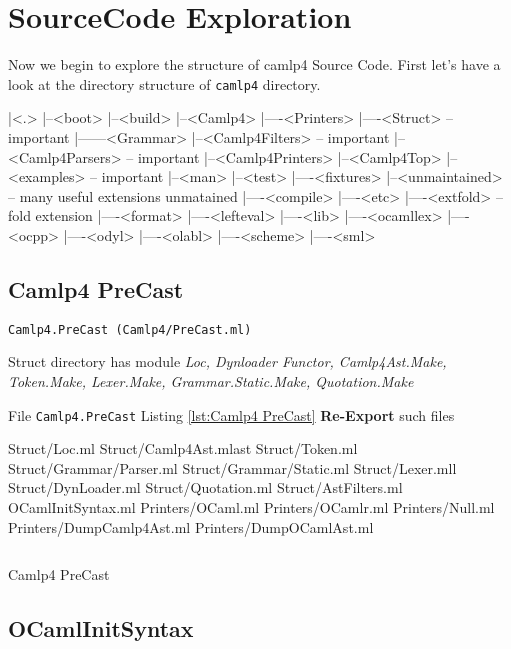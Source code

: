 \section{SourceCode Exploration}
Now we begin to explore the structure of camlp4 Source Code.  First
let's have a look at the directory structure of \verb|camlp4|
directory.


\begin{bluetext}
|<.>
|--<boot>
|--<build>
|--<Camlp4>
|----<Printers>
|----<Struct>       -- important
|------<Grammar> 
|--<Camlp4Filters>  -- important 
|--<Camlp4Parsers>  -- important 
|--<Camlp4Printers> 
|--<Camlp4Top>
|--<examples>       -- important
|--<man>
|--<test>
|----<fixtures>
|--<unmaintained>   -- many useful extensions unmatained
|----<compile>
|----<etc>
|----<extfold>      -- fold extension 
|----<format>
|----<lefteval>
|----<lib>
|----<ocamllex>
|----<ocpp>
|----<odyl>
|----<olabl>
|----<scheme>
|----<sml>
\end{bluetext}


\subsection{Camlp4 PreCast}
\verb|Camlp4.PreCast (Camlp4/PreCast.ml)|

Struct directory has module \textit{Loc, Dynloader Functor,
  Camlp4Ast.Make, Token.Make, Lexer.Make, Grammar.Static.Make,
  Quotation.Make}

File \verb|Camlp4.PreCast| Listing \ref{lst:Camlp4 PreCast}
\textbf{Re-Export} such files

    \begin{bluetext}
    Struct/Loc.ml 
    Struct/Camlp4Ast.mlast 
    Struct/Token.ml 
    Struct/Grammar/Parser.ml 
    Struct/Grammar/Static.ml 
    Struct/Lexer.mll 
    Struct/DynLoader.ml 
    Struct/Quotation.ml 
    Struct/AstFilters.ml 
    OCamlInitSyntax.ml 
    Printers/OCaml.ml 
    Printers/OCamlr.ml
    Printers/Null.ml 
    Printers/DumpCamlp4Ast.ml
    Printers/DumpOCamlAst.ml 
    \end{bluetext}


\begin{listing}
\inputminted[fontsize=\scriptsize, 
lastline=55]{ocaml}{camlp4/code/PreCast_OCamlInitSyntax.ml}
\caption{Camlp4 PreCast}
\label{lst:Camlp4 PreCast}
\end{listing}



\subsection{OCamlInitSyntax}

